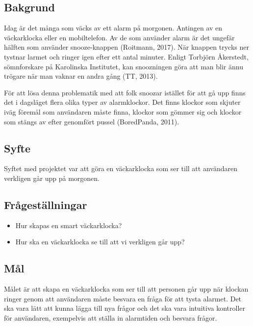 \subsection{Bakgrund}
Idag är det många som väcks av ett alarm på morgonen. Antingen av en väckar\-klocka eller en mobiltelefon. Av de som använder alarm är det ungefär hälften som använder {snooze-knappen} (Roitmann, 2017). När knappen trycks ner tystnar larmet och ringer igen efter ett antal minuter. Enligt Torbjörn Åkerstedt, sömnforskare på Karolinska Institutet, kan snoozningen göra att man blir ännu trögare när man vaknar en andra gång (TT, 2013).

För att lösa denna problematik med att folk snoozar istället för att gå upp finns det i dagsläget flera olika typer av alarmklockor. Det finns klockor som skjuter iväg föremål som användaren måste finna, klockor som gömmer sig och klockor som stängs av efter genomfört pussel (BoredPanda, 2011). 
\subsection{Syfte}
Syftet med projektet var att göra en väckarklocka som ser till att användaren verkligen går upp på morgonen. %
 
 \subsection{Frågeställningar}
\begin{itemize}
    \item {Hur skapas en smart väckarklocka?}
    \item {Hur ska en väckarklocka se till att vi verkligen går upp?}
\end{itemize}

\subsection{Mål}
Målet är att skapa en väckarklocka som ser till att personen går upp när klockan ringer genom att användaren måste besvara en fråga för att tysta alarmet. Det ska vara lätt att kunna lägga till nya frågor och det ska vara intuitiva kontroller för användaren, exempelvis att ställa in alarmtiden och besvara frågor. 

